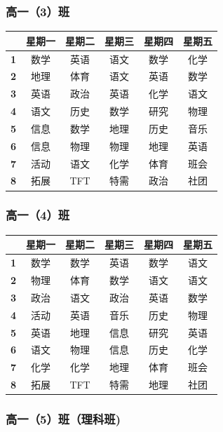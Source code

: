 \documentclass[a4paper]{article}
\begin{document}
  \subsubsection{高一（3）班}

   \begin{tabular}{cccccc}
   \toprule
   & \bf 星期一 & \bf 星期二 & \bf 星期三 & \bf 星期四 & \bf 星期五 \\
   \midrule
   \bf 1 & 数学 & 英语 & 语文 & 数学 & 化学 \\
   \bf 2 & 地理 & 体育 & 语文 & 英语 & 数学 \\
   \bf 3 & 英语 & 政治 & 英语 & 化学 & 语文 \\
   \bf 4 & 语文 & 历史 & 数学 & 研究 & 物理 \\
   \midrule
   \bf 5 & 信息 & 数学 & 地理 & 历史 & 音乐 \\
   \bf 6 & 信息 & 物理 & 物理 & 地理 & 英语 \\
   \bf 7 & 活动 & 语文 & 化学 & 体育 & 班会 \\
   \bf 8 & 拓展 & TFT  & 特需 & 政治 & 社团 \\
   \bottomrule
   \end{tabular}

  \clearpage

  \subsubsection{高一（4）班}

   \begin{tabular}{cccccc}
   \toprule
   & \bf 星期一 & \bf 星期二 & \bf 星期三 & \bf 星期四 & \bf 星期五 \\
   \midrule
   \bf 1 & 数学 & 数学 & 英语 & 数学 & 语文 \\
   \bf 2 & 物理 & 体育 & 数学 & 语文 & 语文 \\
   \bf 3 & 政治 & 语文 & 政治 & 英语 & 数学 \\
   \bf 4 & 活动 & 英语 & 音乐 & 历史 & 物理 \\
   \midrule
   \bf 5 & 英语 & 地理 & 信息 & 研究 & 英语 \\
   \bf 6 & 语文 & 物理 & 信息 & 历史 & 化学 \\
   \bf 7 & 化学 & 化学 & 地理 & 体育 & 班会 \\
   \bf 8 & 拓展 & TFT  & 特需 & 地理 & 社团 \\
   \bottomrule
   \end{tabular}

  \subsubsection{高一（5）班（理科班)}
\end{document}
